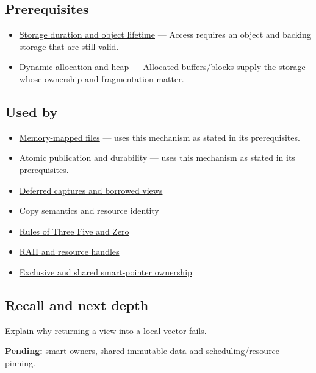 \subsection{Prerequisites}\label{appendix-d52e4486f527-prerequisites}

\begin{itemize}
\tightlist
\item
  \hyperref[appendix-0b104bcba06b]{Storage duration and object lifetime} --- Access requires an object and backing storage that are still valid.
\item
  \hyperref[appendix-c3480f7d9ff3]{Dynamic allocation and heap} --- Allocated buffers/blocks supply the storage whose ownership and fragmentation matter.
\end{itemize}

\subsection{Used by}\label{appendix-d52e4486f527-used-by}

\begin{itemize}
\tightlist
\item
  \hyperref[appendix-313ee7a0ba7b]{Memory-mapped files} --- uses this mechanism as stated in its prerequisites.
\item
  \hyperref[appendix-e89a8f290ef5]{Atomic publication and durability} --- uses this mechanism as stated in its prerequisites.
\item
  \hyperref[appendix-aea529eb5175]{Deferred captures and borrowed views}
\item
  \hyperref[appendix-1340cd1ce582]{Copy semantics and resource identity}
\item
  \hyperref[appendix-7679107d057e]{Rules of Three Five and Zero}
\item
  \hyperref[appendix-69739d3ab49b]{RAII and resource handles}
\item
  \hyperref[appendix-51602cabe815]{Exclusive and shared smart-pointer ownership}
\end{itemize}

\subsection{Recall and next depth}\label{appendix-d52e4486f527-recall-and-next-depth}

Explain why returning a view into a local vector fails.

\textbf{Pending:} smart owners, shared immutable data and scheduling/resource pinning.

